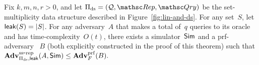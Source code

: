 \begin{theorem}
Fix $k,m,n,r>0$, and let $\Pi_{\mathrm{ds}}= (\calQ,\Rep, \Qry)$ be the set-multiplicity data structure described in Figure~\ref{fig:lin-and-ds}.  For any set~$S$, let ${\sf leak}(S)=|S|$.  For any adversary~$A$ that makes a total of~$q$ queries to its oracle and has time-complexity~$O(t)$, there exists a simulator~${\sf Sim}$ and a prf-adversary ~$B$ (both explicitly constructed in the proof of this theorem) such that
$
\mathrm{\mathbf{Adv}}^{\mathrm{ss\mbox{-}rep}}_{\Pi_{\mathrm{ds}},{\sf leak}}(A,{\sf Sim}) \leq  \mathbf{Adv}^{\mathrm{prf}}_{F}(B).
$
\end{theorem}